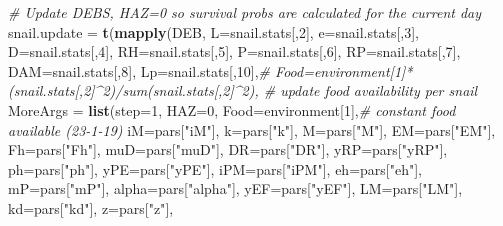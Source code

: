 \documentclass[10,portrait]{article}
\newenvironment{Shaded}{\begin{snugshade}}{\end{snugshade}}
\newcommand{\KeywordTok}[1]{\textcolor[rgb]{0.13,0.29,0.53}{\textbf{#1}}}
\newcommand{\DataTypeTok}[1]{\textcolor[rgb]{0.13,0.29,0.53}{#1}}
\newcommand{\DecValTok}[1]{\textcolor[rgb]{0.00,0.00,0.81}{#1}}
\newcommand{\StringTok}[1]{\textcolor[rgb]{0.31,0.60,0.02}{#1}}
\newcommand{\CommentTok}[1]{\textcolor[rgb]{0.56,0.35,0.01}{\textit{#1}}}
\newcommand{\NormalTok}[1]{#1}
\begin{document}
\begin{Shaded}
\begin{Highlighting}[]
{{{{{                        \CommentTok{# Update DEBS, HAZ=0 so survival probs are calculated for the current day}
\NormalTok{                        snail.update =}\StringTok{ }\KeywordTok{t}\NormalTok{(}\KeywordTok{mapply}\NormalTok{(DEB, }\DataTypeTok{L=}\NormalTok{snail.stats[,}\DecValTok{2}\NormalTok{], }\DataTypeTok{e=}\NormalTok{snail.stats[,}\DecValTok{3}\NormalTok{], }\DataTypeTok{D=}\NormalTok{snail.stats[,}\DecValTok{4}\NormalTok{], }\DataTypeTok{RH=}\NormalTok{snail.stats[,}\DecValTok{5}\NormalTok{],}
                                                \DataTypeTok{P=}\NormalTok{snail.stats[,}\DecValTok{6}\NormalTok{], }\DataTypeTok{RP=}\NormalTok{snail.stats[,}\DecValTok{7}\NormalTok{], }\DataTypeTok{DAM=}\NormalTok{snail.stats[,}\DecValTok{8}\NormalTok{], }\DataTypeTok{Lp=}\NormalTok{snail.stats[,}\DecValTok{10}\NormalTok{],}\CommentTok{# Food=environment[1]*(snail.stats[,2]^2)/sum(snail.stats[,2]^2), # update food availability per snail }
                                                \DataTypeTok{MoreArgs =} \KeywordTok{list}\NormalTok{(}\DataTypeTok{step=}\DecValTok{1}\NormalTok{, }\DataTypeTok{HAZ=}\DecValTok{0}\NormalTok{, }\DataTypeTok{Food=}\NormalTok{environment[}\DecValTok{1}\NormalTok{],}\CommentTok{# constant food available (23-1-19)}
                                                                \DataTypeTok{iM=}\NormalTok{pars[}\StringTok{"iM"}\NormalTok{], }\DataTypeTok{k=}\NormalTok{pars[}\StringTok{"k"}\NormalTok{], }\DataTypeTok{M=}\NormalTok{pars[}\StringTok{"M"}\NormalTok{], }\DataTypeTok{EM=}\NormalTok{pars[}\StringTok{"EM"}\NormalTok{], }\DataTypeTok{Fh=}\NormalTok{pars[}\StringTok{"Fh"}\NormalTok{], }
                                                                \DataTypeTok{muD=}\NormalTok{pars[}\StringTok{"muD"}\NormalTok{],}
                                                                \DataTypeTok{DR=}\NormalTok{pars[}\StringTok{"DR"}\NormalTok{], }\DataTypeTok{yRP=}\NormalTok{pars[}\StringTok{"yRP"}\NormalTok{], }\DataTypeTok{ph=}\NormalTok{pars[}\StringTok{"ph"}\NormalTok{], }\DataTypeTok{yPE=}\NormalTok{pars[}\StringTok{"yPE"}\NormalTok{], }\DataTypeTok{iPM=}\NormalTok{pars[}\StringTok{"iPM"}\NormalTok{], }\DataTypeTok{eh=}\NormalTok{pars[}\StringTok{"eh"}\NormalTok{],}
                                                                \DataTypeTok{mP=}\NormalTok{pars[}\StringTok{"mP"}\NormalTok{], }\DataTypeTok{alpha=}\NormalTok{pars[}\StringTok{"alpha"}\NormalTok{], }\DataTypeTok{yEF=}\NormalTok{pars[}\StringTok{"yEF"}\NormalTok{], }\DataTypeTok{LM=}\NormalTok{pars[}\StringTok{"LM"}\NormalTok{], }\DataTypeTok{kd=}\NormalTok{pars[}\StringTok{"kd"}\NormalTok{], }\DataTypeTok{z=}\NormalTok{pars[}\StringTok{"z"}\NormalTok{], }
}}}}}
\end{Highlighting}
\end{Shaded}
\end{document}
